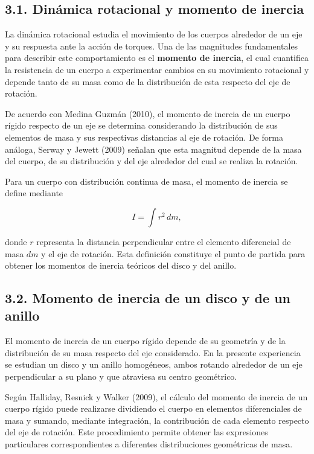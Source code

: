 \documentclass[11pt,a4paper]{article}
\begin{document}
\subsection*{3.1. Dinámica rotacional y momento de inercia}

La dinámica rotacional estudia el movimiento de los cuerpos alrededor de
un eje y su respuesta ante la acción de torques. Una de las magnitudes
fundamentales para describir este comportamiento es el \textbf{momento de
inercia}, el cual cuantifica la resistencia de un cuerpo a experimentar
cambios en su movimiento rotacional y depende tanto de su masa como de la
distribución de esta respecto del eje de rotación.

De acuerdo con Medina Guzmán (2010), el momento de inercia de un cuerpo
rígido respecto de un eje se determina considerando la distribución de sus
elementos de masa y sus respectivas distancias al eje de rotación. De forma
análoga, Serway y Jewett (2009) señalan que esta magnitud depende de la masa
del cuerpo, de su distribución y del eje alrededor del cual se realiza la
rotación.

Para un cuerpo con distribución continua de masa, el momento de inercia se
define mediante

\[
I=\int r^2\,dm,
\]

donde \(r\) representa la distancia perpendicular entre el elemento
diferencial de masa \(dm\) y el eje de rotación. Esta definición constituye
el punto de partida para obtener los momentos de inercia teóricos del disco
y del anillo.



\subsection*{3.2. Momento de inercia de un disco y de un anillo}

El momento de inercia de un cuerpo rígido depende de su geometría y de la
distribución de su masa respecto del eje considerado. En la presente
experiencia se estudian un disco y un anillo homogéneos, ambos rotando
alrededor de un eje perpendicular a su plano y que atraviesa su centro
geométrico.

Según Halliday, Resnick y Walker (2009), el cálculo del momento de inercia
de un cuerpo rígido puede realizarse dividiendo el cuerpo en elementos
diferenciales de masa y sumando, mediante integración, la contribución de
cada elemento respecto del eje de rotación. Este procedimiento permite
obtener las expresiones particulares correspondientes a diferentes
distribuciones geométricas de masa.
\end{document}
